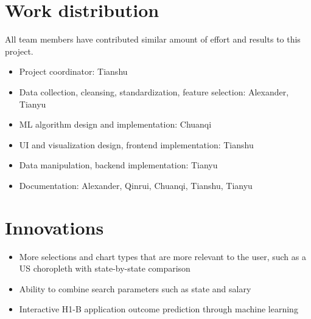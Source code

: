\documentclass[sigconf]{acmart}
\begin{document}
\appendix

\section{Work distribution}
All team members have contributed similar amount of effort and results to this project.

\begin{itemize}
	\item Project coordinator: Tianshu
	\item Data collection, cleansing, standardization, feature selection: Alexander, Tianyu
	\item ML algorithm design and implementation: Chuanqi 
	\item UI and visualization design, frontend implementation: Tianshu
	\item Data manipulation, backend implementation: Tianyu
	\item Documentation: Alexander, Qinrui, Chuanqi, Tianshu, Tianyu
	
\end{itemize}


\section{Innovations}
\begin{itemize}
	\item More selections and chart types that are more relevant to the user, such as a US choropleth with state-by-state comparison
	\item Ability to combine search parameters such as state and salary
	\item Interactive H1-B application outcome prediction through machine learning

\end{itemize}
\end{document}
